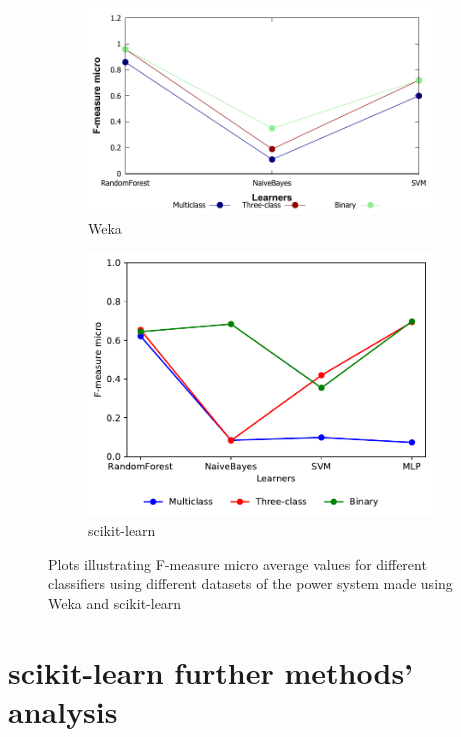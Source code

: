 \begin{figure}[t]
    \centering
    \begin{subfigure}[t]{110mm}
        \includegraphics[width=\linewidth]{images/weka_f1micro}
        \caption{Weka}
    \end{subfigure}
    \begin{subfigure}[t]{110mm}
        \includegraphics[width=\linewidth, page = 1]{images/fmeasure}
        \caption{scikit-learn}
    \end{subfigure}
    \caption{Plots illustrating F-measure micro average values for different classifiers using different datasets of the power system made using Weka and scikit-learn}
    \label{fig:f1_micro}
\end{figure}

\FloatBarrier
\section{scikit-learn further methods' analysis}

